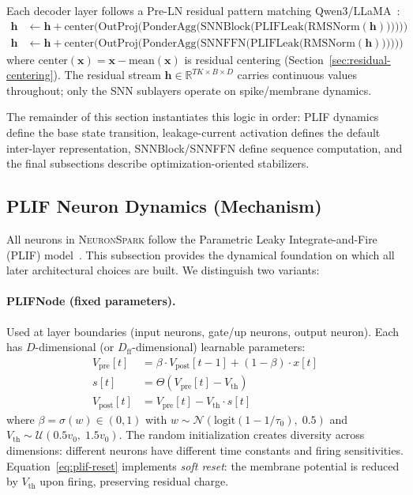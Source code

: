 \documentclass{article}
\newcommand{\model}{\textsc{NeuronSpark}}
\newcommand{\vpost}{V_{\text{post}}}
\newcommand{\vpre}{V_{\text{pre}}}
\newcommand{\vth}{V_{\text{th}}}
\newcommand{\R}{\mathbb{R}}
\begin{document}
Each decoder layer follows a Pre-LN residual pattern matching Qwen3/LLaMA~\citep{touvron2023llama, yang2025qwen3}:
\begin{align}
    \mathbf{h} &\leftarrow \mathbf{h} + \text{center}\big(\text{OutProj}\big(\text{PonderAgg}\big(\text{SNNBlock}\big(\text{PLIFLeak}\big(\text{RMSNorm}(\mathbf{h})\big)\big)\big)\big)\big) \label{eq:layer-block} \\
    \mathbf{h} &\leftarrow \mathbf{h} + \text{center}\big(\text{OutProj}\big(\text{PonderAgg}\big(\text{SNNFFN}\big(\text{PLIFLeak}\big(\text{RMSNorm}(\mathbf{h})\big)\big)\big)\big)\big) \label{eq:layer-ffn}
\end{align}
where $\text{center}(\mathbf{x}) = \mathbf{x} - \text{mean}(\mathbf{x})$ is residual centering (Section~\ref{sec:residual-centering}).
The residual stream $\mathbf{h} \in \R^{TK \times B \times D}$ carries continuous values throughout; only the SNN sublayers operate on spike/membrane dynamics.

The remainder of this section instantiates this logic in order: PLIF dynamics define the base state transition, leakage-current activation defines the default inter-layer representation, SNNBlock/SNNFFN define sequence computation, and the final subsections describe optimization-oriented stabilizers.


\subsection{PLIF Neuron Dynamics (Mechanism)}
\label{sec:plif}

All neurons in \model{} follow the Parametric Leaky Integrate-and-Fire (PLIF) model~\citep{fang2021incorporating}. This subsection provides the dynamical foundation on which all later architectural choices are built.
We distinguish two variants:

\paragraph{PLIFNode (fixed parameters).}
Used at layer boundaries (input neurons, gate/up neurons, output neuron).
Each has $D$-dimensional (or $D_{\text{ff}}$-dimensional) learnable parameters:
\begin{align}
    \vpre[t] &= \beta \cdot \vpost[t-1] + (1-\beta) \cdot x[t] \label{eq:plif-charge} \\
    s[t] &= \Theta(\vpre[t] - \vth) \label{eq:plif-fire} \\
    \vpost[t] &= \vpre[t] - \vth \cdot s[t] \label{eq:plif-reset}
\end{align}
where $\beta = \sigma(w) \in (0,1)$ with $w \sim \mathcal{N}(\text{logit}(1 - 1/\tau_0),\; 0.5)$ and $\vth \sim \mathcal{U}(0.5 v_0,\; 1.5 v_0)$.
The random initialization creates diversity across dimensions: different neurons have different time constants and firing sensitivities.
Equation~\eqref{eq:plif-reset} implements \emph{soft reset}: the membrane potential is reduced by $\vth$ upon firing, preserving residual charge.
\end{document}
